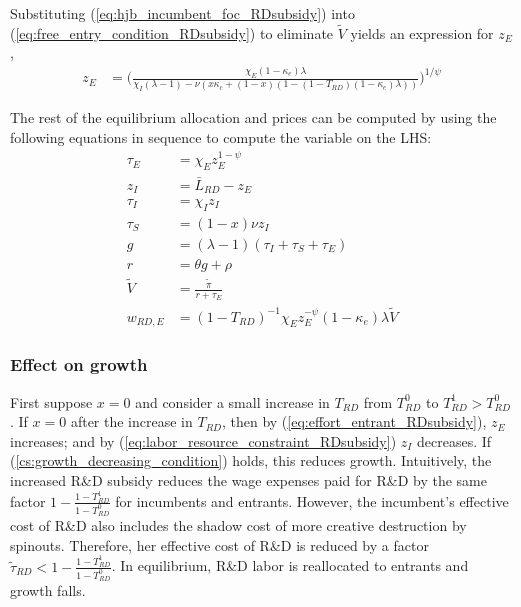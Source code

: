 \documentclass[11pt,english]{article}
\theoremstyle{remark}
\begin{document}
Substituting (\ref{eq:hjb_incumbent_foc_RDsubsidy}) into (\ref{eq:free_entry_condition_RDsubsidy}) to eliminate $\tilde{V}$ yields an expression for $z_E$, 
\begin{align}
z_E &= \Bigg( \frac{\chi_E (1-\kappa_{e}) \lambda}{\chi_I(\lambda -1) - \nu (x\kappa_c + (1-x)(1 - (1-T_{RD})(1-\kappa_e)\lambda)) } \Bigg)^{1/\psi} \label{eq:effort_entrant_RDsubsidy}
\end{align}

The rest of the equilibrium allocation and prices can be computed by using the following equations in sequence to compute the variable on the LHS:
\begin{align}
	\tau_E &= \chi_E z_E^{1-\psi} \\
	z_I &= \bar{L}_{RD} - z_E \label{eq:labor_resource_constraint_RDsubsidy}\\ 
	\tau_I &= \chi_I z_I \\
	\tau_S &= (1-x) \nu z_I \\
	g &= (\lambda - 1) (\tau_I + \tau_S + \tau_E) \\
	r &= \theta g + \rho \\
	\tilde{V} &= \frac{\tilde{\pi}}{r + \tau_E} \\ 
	w_{RD,E} &= (1-T_{RD})^{-1}\chi_E z_E^{-\psi} (1-\kappa_e) \lambda \tilde{V} \label{eq:wage_rd_labor_RDsubsidy}
\end{align}

\subsubsection{Effect on growth}

First suppose $x = 0$ and consider a small increase in $T_{RD}$ from $T_{RD}^0$ to $T_{RD}^1 > T_{RD}^0$. If $x = 0$ after the increase in $T_{RD}$, then by (\ref{eq:effort_entrant_RDsubsidy}), $z_E$ increases; and by (\ref{eq:labor_resource_constraint_RDsubsidy}) $z_I$ decreases. If (\ref{cs:growth_decreasing_condition}) holds, this reduces growth. Intuitively, the increased R\&D subsidy reduces the wage expenses paid for R\&D by the same factor $1-\frac{1-T_{RD}^1}{1-T_{RD}^0}$ for incumbents and entrants. However, the incumbent's effective cost of R\&D also includes the shadow cost of more creative destruction by spinouts. Therefore, her effective cost of R\&D is reduced by a factor $\tilde{\tau}_{RD} < 1-\frac{1-T_{RD}^1}{1-T_{RD}^0}$. In equilibrium, R\&D labor is reallocated to entrants and growth falls.
\end{document}
